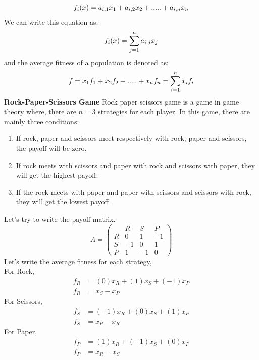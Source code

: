 \documentclass{article}
\begin{document}
\begin{equation}
f_i(x)=a_{i,1}x_1+a_{i,2}x_2+.....+a_{i,n}x_n\nonumber\\
\end{equation}
We can write this equation as:
\begin{equation}
f_i(x)=\sum_{j=1}^{n}a_{i,j}x_j\nonumber\\
\end{equation}
and the average fitness of a population is denoted as:
\begin{equation}
\bar{f}=x_1f_1+x_2f_2+.....+x_nf_n= \sum_{i=1}^{n}x_if_i\nonumber\\
\end{equation}
\textbf{Rock-Paper-Scissors Game}
\newline
Rock paper scissors game is a game in game theory where, there are $n=3$ strategies for each player. In this game, there are mainly three conditions:
\begin{enumerate}
\item If rock, paper and scissors meet respectively with rock, paper and scissors, the payoff will be zero.
\item If rock meets with scissors and paper with rock and scissors with paper, they will get the highest payoff.
\item If the rock meets with paper and paper with scissors and scissors with rock, they will get the lowest payoff.
\end{enumerate}
Let's try to write the payoff matrix.
\begin{equation}
A =
\begin{pmatrix}
  & R & S & P \\
R & 0 & 1 & -1 \\
S & -1 & 0 & 1 \\
P & 1 & -1 & 0
\end{pmatrix}
\end{equation}
Let's write the average fitness for each strategy,\\
For Rock,
\begin{align}
f_R &= (0)x_R + (1)x_S + (-1)x_P \nonumber\\
f_R &= x_S - x_P \nonumber
\end{align}
For Scissors,
\begin{align}
f_S &= (-1)x_R + (0)x_S + (1)x_P \nonumber\\
f_S &= x_P - x_R \nonumber
\end{align}
For Paper,
\begin{align}
f_P &= (1)x_R + (-1)x_S + (0)x_P \nonumber\\
f_P &= x_R - x_S \nonumber
\end{align}
\end{document}
